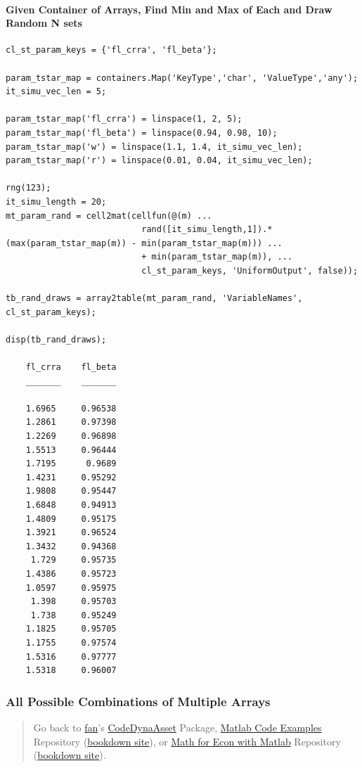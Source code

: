 \documentclass[
]{book}
\begin{document}
\hypertarget{given-container-of-arrays-find-min-and-max-of-each-and-draw-random-n-sets}{%
\paragraph{Given Container of Arrays, Find Min and Max of Each and Draw Random N sets}\label{given-container-of-arrays-find-min-and-max-of-each-and-draw-random-n-sets}}

\begin{verbatim}
cl_st_param_keys = {'fl_crra', 'fl_beta'};

param_tstar_map = containers.Map('KeyType','char', 'ValueType','any');
it_simu_vec_len = 5;

param_tstar_map('fl_crra') = linspace(1, 2, 5);
param_tstar_map('fl_beta') = linspace(0.94, 0.98, 10);
param_tstar_map('w') = linspace(1.1, 1.4, it_simu_vec_len);
param_tstar_map('r') = linspace(0.01, 0.04, it_simu_vec_len);

rng(123);
it_simu_length = 20;
mt_param_rand = cell2mat(cellfun(@(m) ...
                           rand([it_simu_length,1]).*(max(param_tstar_map(m)) - min(param_tstar_map(m))) ...
                           + min(param_tstar_map(m)), ...
                           cl_st_param_keys, 'UniformOutput', false));

tb_rand_draws = array2table(mt_param_rand, 'VariableNames', cl_st_param_keys);

disp(tb_rand_draws);

    fl_crra    fl_beta
    _______    _______

    1.6965     0.96538
    1.2861     0.97398
    1.2269     0.96898
    1.5513     0.96444
    1.7195      0.9689
    1.4231     0.95292
    1.9808     0.95447
    1.6848     0.94913
    1.4809     0.95175
    1.3921     0.96524
    1.3432     0.94368
     1.729     0.95735
    1.4386     0.95723
    1.0597     0.95975
     1.398     0.95703
     1.738     0.95249
    1.1825     0.95705
    1.1755     0.97574
    1.5316     0.97777
    1.5318     0.96007
\end{verbatim}

\hypertarget{all-possible-combinations-of-multiple-arrays}{%
\subsubsection{All Possible Combinations of Multiple Arrays}\label{all-possible-combinations-of-multiple-arrays}}

\begin{quote}
Go back to \href{http://fanwangecon.github.io/}{fan}'s \href{https://fanwangecon.github.io/CodeDynaAsset/}{CodeDynaAsset} Package, \href{https://fanwangecon.github.io/M4Econ/}{Matlab Code Examples} Repository (\href{https://fanwangecon.github.io/M4Econ/bookdown}{bookdown site}), or \href{https://fanwangecon.github.io/Math4Econ/}{Math for Econ with Matlab} Repository (\href{https://fanwangecon.github.io/Math4Econ/bookdown}{bookdown site}).
\end{quote}
\end{document}
